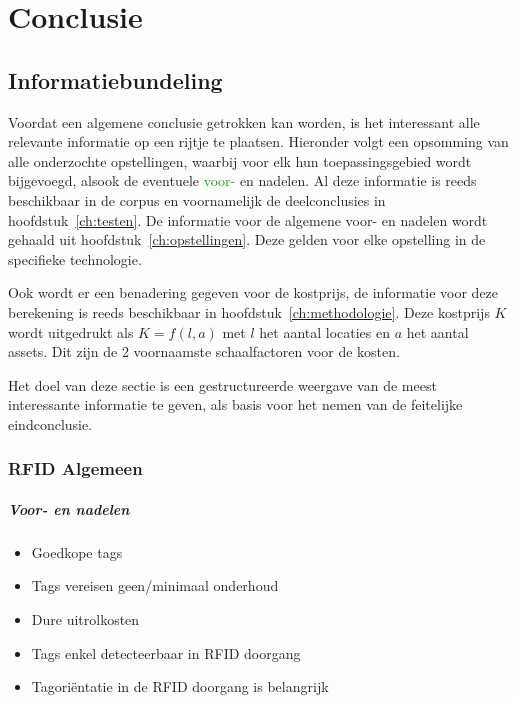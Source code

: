 
\chapter{Conclusie}
\label{ch:conclusie}
\section{Informatiebundeling}
\label{sec:con-inf}
Voordat een algemene conclusie getrokken kan worden, is het interessant alle relevante informatie op een rijtje te plaatsen. Hieronder volgt een opsomming van alle onderzochte opstellingen, waarbij voor elk hun toepassingsgebied wordt bijgevoegd, alsook de eventuele \textcolor{ForestGreen}{voor-} en \textcolor{RedOrange}{nadelen}. Al deze informatie is reeds beschikbaar in de corpus en voornamelijk de deelconclusies in hoofdstuk~\ref{ch:testen}. De informatie voor de algemene voor- en nadelen wordt gehaald uit hoofdstuk~\ref{ch:opstellingen}. Deze gelden voor elke opstelling in de specifieke technologie.

Ook wordt er een benadering gegeven voor de kostprijs, de informatie voor deze berekening is reeds beschikbaar in hoofdstuk~\ref{ch:methodologie}. Deze kostprijs \(K\) wordt uitgedrukt als \(K = f(l, a)\) met \(l\) het aantal locaties en \(a\) het aantal assets. Dit zijn de 2 voornaamste schaalfactoren voor de kosten.

Het doel van deze sectie is een gestructureerde weergave van de meest interessante informatie te geven, als basis voor het nemen van de feitelijke eindconclusie.

\subsection{RFID Algemeen}
\label{sec:con-ant-RFID}
\paragraph{Voor- en nadelen}
\begin{itemize}
	\color{ForestGreen}
	\item Goedkope tags
	\item Tags vereisen geen/minimaal onderhoud
	\color{RedOrange}
	\item Dure uitrolkosten
	\item Tags enkel detecteerbaar in RFID doorgang
	\item Tagoriëntatie in de RFID doorgang is belangrijk
\end{itemize}

